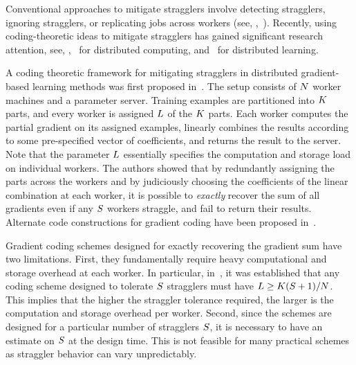 \documentclass[conference,letterpaper]{IEEEtran}
\begin{document}
Conventional approaches to mitigate stragglers involve detecting stragglers, ignoring stragglers, or replicating jobs across workers  (see, \eg,~\cite{Ananthanarayanan:10:matri,Ananthnarayanan:13:clones,Wang:Joshi:15,Chen:16}). 
Recently, using coding-theoretic ideas to mitigate stragglers has gained significant research attention, see, \eg,~\cite{Lee:18,Dutta:16,Avestimehr:18:coded-matrix,Aktas:17} for distributed computing, and~\cite{Tandon:17,Halbawi:17,Raviv:18,YeAbbe:18i,Avestimehr:17} for distributed learning. %

A coding theoretic framework for mitigating stragglers in distributed gradient-based learning methods was first proposed in~\cite{Tandon:17}. The setup consists of $N$ worker machines and a parameter server. Training examples are partitioned into $K$ parts, and every worker is assigned $L$ of the $K$ parts. Each worker computes the partial gradient on its assigned examples, linearly combines the results according to some pre-specified vector of coefficients, and returns the result to the server. Note that the parameter $L$ essentially specifies the computation and storage load on individual workers. The authors  showed that by redundantly assigning the parts across the workers and by judiciously choosing the coefficients of the linear combination at each worker, it is possible to {\it exactly} recover the sum of all gradients even if any $S$ workers straggle, and fail to return their results. %
Alternate code constructions for gradient coding have been proposed in~\cite{Dutta:16,Halbawi:17,Raviv:18,YeAbbe:18}.

Gradient coding schemes designed for exactly recovering the gradient sum have two limitations. First, they fundamentally require heavy computational and storage overhead at each worker. In particular, in~\cite{Tandon:17}, it was established that any coding scheme designed to tolerate $S$ stragglers must have $L \geq K(S + 1)/N$. This implies that the higher the straggler tolerance required, the larger is the computation and storage overhead per worker. Second, since the schemes are designed for a particular number of stragglers $S$, it is necessary to have an estimate on $S$ at the design time. This is not feasible for many practical schemes as straggler behavior can vary unpredictably.
\end{document}
